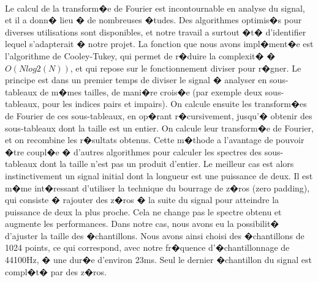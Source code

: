		\paragraph{}
	Le calcul de la transform�e de Fourier est incontournable en analyse du signal, et il a donn� lieu � de nombreuses �tudes. 
	Des algorithmes optimis�s pour diverses utilisations sont disponibles, et notre travail a surtout �t� d'identifier lequel s'adapterait 
	� notre projet. La fonction que nous avons impl�ment�e est l'algorithme de Cooley-Tukey, qui permet de r�duire la complexit� � $O(Nlog2(N))$, 
	et qui repose sur le fonctionnement diviser pour r�gner.  Le principe est dans un premier temps de diviser le signal 
	� analyser en sous-tableaux de m�mes tailles, de mani�re crois�e (par exemple deux sous-tableaux, pour les indices 
	pairs et impairs). On calcule ensuite les transform�es de Fourier de ces sous-tableaux, en op�rant r�cursivement, 
	jusqu'� obtenir des sous-tableaux dont la taille est un entier. On calcule leur transform�e de Fourier, et on recombine 
	les r�sultats obtenus. Cette m�thode a l'avantage de pouvoir �tre coupl�e � d'autres algorithmes pour calculer les 
	spectres des sous-tableaux dont la taille n'est pas un produit d'entier. Le meilleur cas est alors instinctivement un 
	signal initial dont la longueur est une puissance de deux. Il est m�me int�ressant d'utiliser la technique du bourrage 
	de z�ros (zero padding), qui consiste � rajouter des z�ros � la suite du signal pour atteindre la puissance de deux la 
	plus proche. Cela ne change pas le spectre obtenu et augmente les performances. Dans notre cas, nous avons eu 
	la possibilit� d'ajuster la taille des �chantillons. Nous avons ainsi choisi des �chantillons de 1024 points, ce qui 
	correspond, avec notre fr�quence d'�chantillonnage de 44100Hz, � une dur�e d'environ 23ms. Seul le dernier �chantillon du signal est compl�t� par des z�ros.
